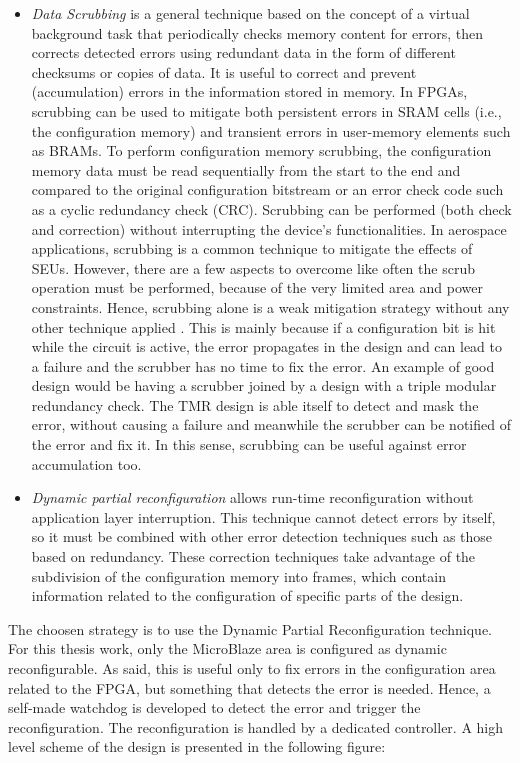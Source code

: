 \begin{itemize}
    \item \textit{Data Scrubbing} is a general technique based on the concept of a virtual background task that periodically checks memory content for errors, then corrects detected errors using redundant data in the form of different checksums or copies of data. It is useful to correct and prevent (accumulation) errors in the information stored in memory. In FPGAs, scrubbing can be used to mitigate both persistent errors in SRAM cells (i.e., the configuration memory) and transient errors in user-memory elements such as BRAMs. To perform configuration memory scrubbing, the configuration memory data must be read sequentially from the start to the end and compared to the original configuration bitstream or an error check code such as a cyclic redundancy check (CRC). Scrubbing can be performed (both check and correction) without interrupting the device's functionalities. In aerospace applications, scrubbing is a common technique to mitigate the effects of SEUs. However, there are a few aspects to overcome like often the scrub operation must be performed, because of the very limited area and power constraints. Hence, scrubbing alone is a weak mitigation strategy without any other technique applied \cite{nasa_scrubbing}. This is mainly because if a configuration bit is hit while the circuit is active, the error propagates in the design and can lead to a failure and the scrubber has no time to fix the error. An example of good design would be having a scrubber joined by a design with a triple modular redundancy check. The TMR design is able itself to detect and mask the error, without causing a failure and meanwhile the scrubber can be notified of the error and fix it. In this sense, scrubbing can be useful against error accumulation too.
    \item \textit{Dynamic partial reconfiguration} \cite{10.1007/978-3-030-44534-8_7} allows run-time reconfiguration without application layer interruption. This technique cannot detect errors by itself, so it must be combined with other error detection techniques such as those based on redundancy. These correction techniques take advantage of the subdivision of the configuration memory into frames, which contain information related to the configuration of specific parts of the design. 
\end{itemize}

The choosen strategy is to use the Dynamic Partial Reconfiguration technique. For this thesis work, only the MicroBlaze area is configured as dynamic reconfigurable. As said, this is useful only to fix errors in the configuration area related to the FPGA, but something that detects the error is needed. Hence, a self-made watchdog is developed to detect the error and trigger the reconfiguration. The reconfiguration is handled by a dedicated controller. A high level scheme of the design is presented in the following figure:

